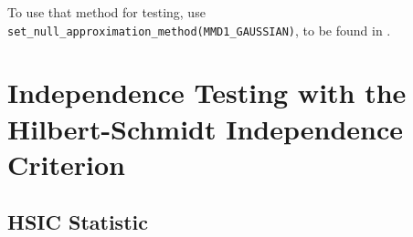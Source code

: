 To use that method for testing, use \texttt{set\_null\_approximation\_method(MMD1\_GAUSSIAN)}, to be found in .

\section{Independence Testing with the Hilbert-Schmidt Independence Criterion}
\label{sec:independence_testing_into}

\subsection{HSIC Statistic}
\label{sec:hsic_test}